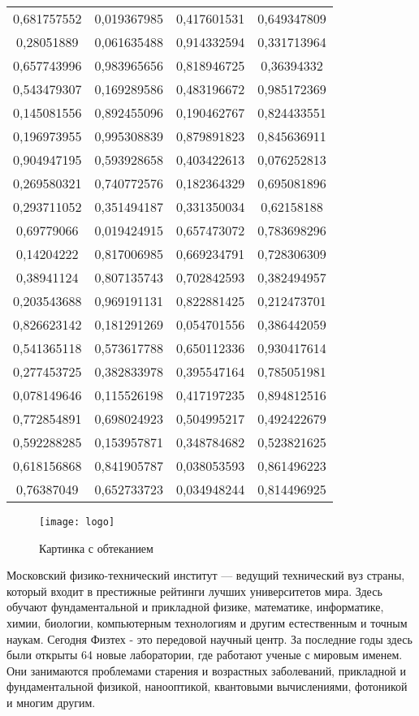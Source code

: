 \documentclass[a4paper,14pt]{extarticle}
\begin{document}
\begin{longtable}{|c|c|c|c|}
	0,681757552 & 0,019367985 & 0,417601531 & 0,649347809 \\
	0,28051889 & 0,061635488 & 0,914332594 & 0,331713964 \\
	0,657743996 & 0,983965656 & 0,818946725 & 0,36394332 \\
	0,543479307 & 0,169289586 & 0,483196672 & 0,985172369 \\
	0,145081556 & 0,892455096 & 0,190462767 & 0,824433551 \\
	0,196973955 & 0,995308839 & 0,879891823 & 0,845636911 \\
	0,904947195 & 0,593928658 & 0,403422613 & 0,076252813 \\
	0,269580321 & 0,740772576 & 0,182364329 & 0,695081896 \\
	0,293711052 & 0,351494187 & 0,331350034 & 0,62158188 \\
	0,69779066 & 0,019424915 & 0,657473072 & 0,783698296 \\
	0,14204222 & 0,817006985 & 0,669234791 & 0,728306309 \\
	0,38941124 & 0,807135743 & 0,702842593 & 0,382494957 \\
	0,203543688 & 0,969191131 & 0,822881425 & 0,212473701 \\
	0,826623142 & 0,181291269 & 0,054701556 & 0,386442059 \\
	0,541365118 & 0,573617788 & 0,650112336 & 0,930417614 \\
	0,277453725 & 0,382833978 & 0,395547164 & 0,785051981 \\
	0,078149646 & 0,115526198 & 0,417197235 & 0,894812516 \\
	0,772854891 & 0,698024923 & 0,504995217 & 0,492422679 \\
	0,592288285 & 0,153957871 & 0,348784682 & 0,523821625 \\
	0,618156868 & 0,841905787 & 0,038053593 & 0,861496223 \\
	0,76387049 & 0,652733723 & 0,034948244 & 0,814496925 \\
\end{longtable}

\begin{wrapfigure}[8]{l}{0.4\linewidth}
	\texttt{[image: logo]}
	\caption{Картинка с обтеканием}
\end{wrapfigure}Московский физико-технический институт — ведущий технический вуз страны, который входит в престижные рейтинги лучших университетов мира. Здесь обучают фундаментальной и прикладной физике, математике, информатике, химии, биологии, компьютерным технологиям и другим естественным и точным наукам. Сегодня Физтех - это передовой научный центр. За последние годы здесь были открыты 64 новые лаборатории, где работают ученые с мировым именем. Они занимаются проблемами старения и возрастных заболеваний, прикладной и фундаментальной физикой, нанооптикой, квантовыми вычислениями, фотоникой и многим другим.
\end{document}
